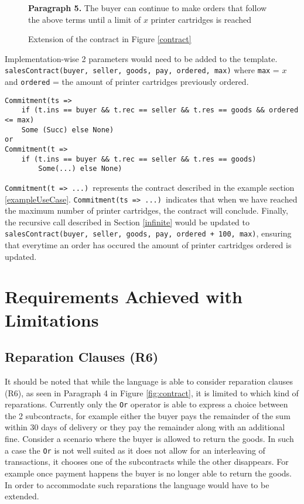 \documentclass{ituthesis}
\begin{document}
\begin{figure}[!h]
    \centering
    \begin{tcolorbox}
        \textbf{Paragraph 5.} The buyer can continue to make orders that follow the above terms until a limit of $x$ printer cartridges is reached  \par
    \end{tcolorbox}
    \caption{Extension of the contract in Figure \ref{contract}}
    \label{fig:history}
\end{figure}
Implementation-wise 2 parameters would need to be added to the template. \texttt{salesContract(buyer, seller, goods, pay, ordered, max)} where \texttt{max} = $x$ and \texttt{ordered} = the amount of printer cartridges previously ordered.
\begin{lstlisting}
Commitment(ts => 
    if (t.ins == buyer && t.rec == seller && t.res == goods && ordered <= max)
    Some (Succ) else None)
or
Commitment(t => 
    if (t.ins == buyer && t.rec == seller && t.res == goods) 
        Some(...) else None)
\end{lstlisting}
\texttt{Commitment(t => ...)}\ represents the contract described in the example section \ref{exampleUseCase}. \texttt{Commitment(ts => ...)}\ indicates that when we have reached the maximum number of printer cartridges, the contract will conclude.
Finally, the recursive call described in Section \ref{infinite} would be updated to \texttt{salesContract(buyer, seller, goods, pay, ordered + 100, max)}, ensuring that everytime an order has occured the amount of printer cartridges ordered is updated.


\section{Requirements Achieved with Limitations}

\subsection{Reparation Clauses (R6)}
It should be noted that while the language is able to consider reparation clauses (R6), as seen in Paragraph 4 in Figure \ref{fig:contract}, it is limited to which kind of reparations. Currently only the \texttt{Or} operator is able to express a choice between the 2 subcontracts, for example either the buyer pays the remainder of the sum within 30 days of delivery or they pay the remainder along with an additional fine. Consider a scenario where the buyer is allowed to return the goods. In such a case the \texttt{Or} is not well suited as it does not allow for an interleaving of transactions, it chooses one of the subcontracts while the other disappears. For example once payment happens the buyer is no longer able to return the goods. In order to accommodate such reparations the language would have to be extended.
\end{document}
